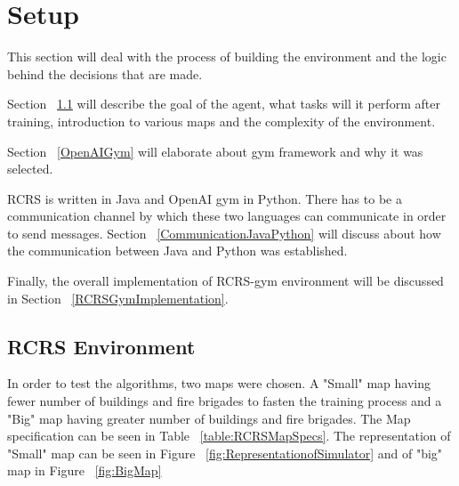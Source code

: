 \documentclass[12pt]{report}
\begin{document}
\section{Setup} \label{Setup}

This section will deal with the process of building the environment and the logic behind the decisions that are made. 

Section ~\ref{RCRSEnvironment} will describe the goal of the agent, what tasks will it perform after training, introduction to various maps and the complexity of the environment. 

Section ~\ref{OpenAIGym} will elaborate about gym framework and why it was selected.

RCRS is written in Java and OpenAI gym in Python. There has to be a communication channel by which these two languages can communicate in order to send messages. Section ~\ref{CommunicationJavaPython} will discuss about how the communication between Java and Python was established. 

Finally, the overall implementation of RCRS-gym environment will be discussed in Section ~\ref{RCRSGymImplementation}. 





\subsection{RCRS Environment} \label{RCRSEnvironment}


In order to test the algorithms, two maps were chosen. A "Small" map having fewer number of buildings and fire brigades to fasten the training process and a "Big" map having greater number of buildings and fire brigades. The Map specification can be seen in Table ~\ref{table:RCRSMapSpecs}. The representation of "Small" map can be seen in Figure ~\ref{fig:RepresentationofSimulator} and of "big" map in Figure ~\ref{fig:BigMap}
\end{document}
